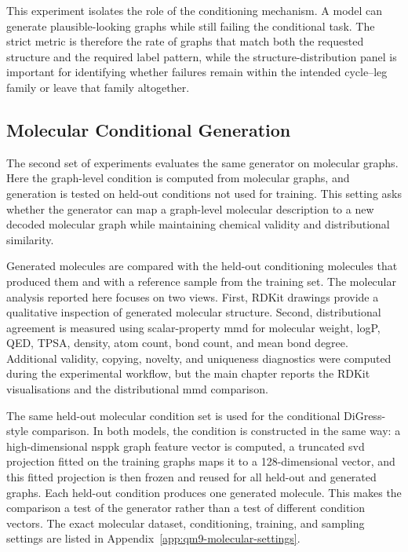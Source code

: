 This experiment isolates the role of the conditioning mechanism. A model can
generate plausible-looking graphs while still failing the conditional task. The
strict metric is therefore the rate of graphs that match both the requested
structure and the required label pattern, while the structure-distribution
panel is important for identifying whether failures remain within the intended
cycle--leg family or leave that family altogether.

\subsection{Molecular Conditional Generation}

The second set of experiments evaluates the same generator on molecular graphs.
Here the graph-level condition is computed from molecular graphs, and generation
is tested on held-out conditions not used for training. This setting asks
whether the generator can map a graph-level molecular description to a new
decoded molecular graph while maintaining chemical validity and distributional
similarity.

Generated molecules are compared with the held-out conditioning molecules that
produced them and with a reference sample from the training set. The molecular
analysis reported here focuses on two views. First, RDKit drawings provide a
qualitative inspection of generated molecular structure. Second,
distributional agreement is measured using scalar-property \gls{mmd} for
molecular weight, logP, QED, TPSA, density, atom count, bond count, and mean
bond degree. Additional validity, copying, novelty, and uniqueness diagnostics
were computed during the experimental workflow, but the main chapter reports
the RDKit visualisations and the distributional \gls{mmd} comparison.

The same held-out molecular condition set is used for the conditional
DiGress-style comparison. In both models, the condition is constructed in the
same way: a high-dimensional \gls{nsppk} graph feature vector is computed, a
truncated \gls{svd} projection fitted on the training graphs maps it to a
128-dimensional vector, and this fitted projection is then frozen and reused for
all held-out and generated graphs. Each held-out condition produces one
generated molecule. This makes the comparison a test of the generator rather
than a test of different condition vectors. The exact molecular dataset,
conditioning, training, and sampling settings are listed in
Appendix~\ref{app:qm9-molecular-settings}.

